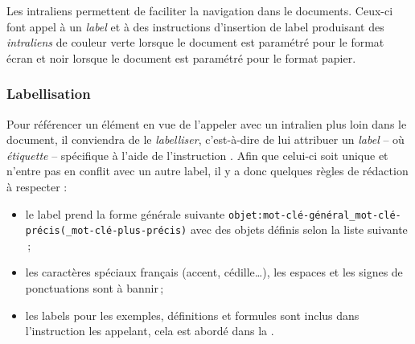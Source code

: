 \documentclass[a4paper, 11pt, twoside, fleqn]{memoir}
\begin{document}
	Les intraliens permettent de faciliter la navigation dans le documents. Ceux-ci font appel à un \emph{label} et à des instructions d'insertion de label produisant des \emph{intraliens} de couleur verte lorsque le document est paramétré pour le format écran et noir lorsque le document est paramétré pour le format papier.
	
	\subsubsection{Labellisation}

	Pour référencer un élément en vue de l'appeler avec un intralien plus loin dans le document, il conviendra de le \emph{labelliser}, c'est-à-dire de lui attribuer un \emph{label} -- où \emph{étiquette} -- spécifique à l'aide de l'instruction \texttt{\label{<label de l'élément>}} . Afin que celui-ci soit unique et n'entre pas en conflit avec un autre label, il y a donc quelques règles de rédaction à respecter :
	
	\begin{itemize}
	    \item le label prend la forme générale suivante \texttt{objet\string:mot-clé-général\_mot-clé-précis(\_mot-clé-plus-précis)} avec des objets définis selon la liste suivante \,;
	    \item les caractères spéciaux français (accent, cédille\ldots), les espaces et les signes de ponctuations sont à bannir\,;
		\item les labels pour les exemples, définitions et formules sont inclus dans l'instruction les appelant, cela est abordé dans la .\\
	\end{itemize}
	 
\end{document}
